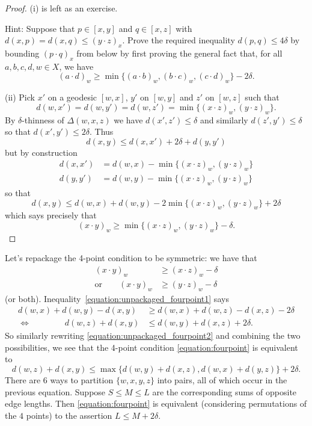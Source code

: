 \begin{proof}
    (i) is left as an exercise.

    Hint: Suppose that $p \in [x, y]$ and $q \in [x, z]$ with $d(x, p) = d(x, q) \leq (y \cdot z)_x$.
    Prove the required inequality $d(p, q) \leq 4\delta$ by bounding $(p \cdot q)_x$ from below by first proving the general fact that, for all $a, b, c, d, w \in X$, we have \[
        (a \cdot d)_w \geq \min\{(a \cdot b)_w, (b \cdot c)_w, (c \cdot d)_w\} - 2\delta.
    \]

    (ii) Pick $x'$ on a geodesic $[w, x]$, $y'$ on $[w, y]$ and $z'$ on $[w, z]$ such that \[
        d(w, x') = d(w, y') = d(w, z') = \min\{ (x \cdot z)_w, (y \cdot z)_w \}.
    \]
    By $\delta$-thinness of $\Delta(w, x, z)$ we have $d(x', z') \leq \delta$ and similarly $d(z', y') \leq \delta$ so that $d(x', y') \leq 2\delta$.
    Thus \[
        d(x, y) \leq d(x, x') + 2\delta + d(y, y')
    \] but by construction
    \begin{align*}
        d(x, x') &= d(w, x) - \min\{ (x \cdot z)_w, (y \cdot z)_w \} \\
        d(y, y') &= d(w, y) - \min\{ (x \cdot z)_w, (y \cdot z)_w \}
    \end{align*}
    so that \[
        d(x, y) \leq d(w, x) + d(w, y) - 2\min\{ (x \cdot z)_w, (y \cdot z)_w \} + 2 \delta
    \] which says precisely that \[
        (x \cdot y)_w \geq \min\{ (x \cdot z)_w, (y \cdot z)_w \} - \delta.
    \]
\end{proof}

Let's repackage the 4-point condition to be symmetric: we have that
\begin{align}
    \label{equation:unpackaged_fourpoint1}
    (x \cdot y)_w
        &\geq (x \cdot z)_w - \delta \\
    \label{equation:unpackaged_fourpoint2}
    \text{or} \qquad (x \cdot y)_w
        &\geq (y \cdot z)_w - \delta
\end{align}
(or both).
Inequality~\eqref{equation:unpackaged_fourpoint1} says
\begin{align*}
    d(w, x) + d(w, y) - d(x, y)
        &\geq d(w, x) + d(w, z) - d(x, z) - 2\delta \\
    \Leftrightarrow \qquad \qquad d(w, z) + d(x, y)
        &\leq d(w, y) + d(x, z) + 2\delta.
\end{align*}
So similarly rewriting \eqref{equation:unpackaged_fourpoint2} and combining the two possibilities, we see that the 4-point condition \eqref{equation:fourpoint} is equivalent to \begin{equation}
    \label{equation:symmetric_fourpoint}
    d(w, z) + d(x, y) \leq \max \{ d(w, y) + d(x, z), d(w, x) + d(y, z) \} + 2\delta. \tag{$\diamond$}
\end{equation}
There are $6$ ways to partition $\{w, x, y, z\}$ into pairs, all of which occur in the previous equation.
Suppose $S \leq M \leq L$ are the corresponding sums of opposite edge lengths.
Then \eqref{equation:fourpoint} is equivalent (considering permutations of the $4$ points) to the assertion $L \leq M + 2\delta$.

